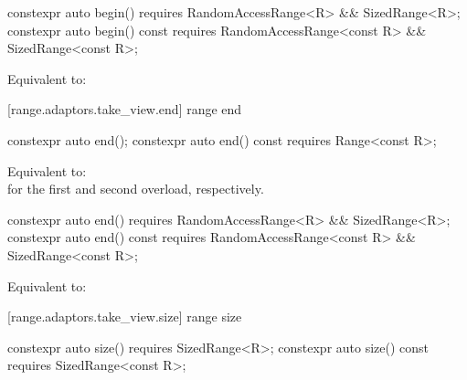 {%
\begin{itemdecl}
constexpr auto begin() requires RandomAccessRange<R> && SizedRange<R>;
constexpr auto begin() const
  requires RandomAccessRange<const R> && SizedRange<const R>;
\end{itemdecl}

\begin{itemdescr}
\pnum
\effects Equivalent to: 
\end{itemdescr}

[range.adaptors.take_view.end]{ range end}

%
\begin{itemdecl}
constexpr auto end();
constexpr auto end() const requires Range<const R>;
\end{itemdecl}

\begin{itemdescr}

\pnum
\effects Equivalent to:
 \\
 for the first and second overload, respectively.
\end{itemdescr}

%
\begin{itemdecl}
constexpr auto end() requires RandomAccessRange<R> && SizedRange<R>;
constexpr auto end() const
  requires RandomAccessRange<const R> && SizedRange<const R>;
\end{itemdecl}

\begin{itemdescr}
\pnum
\effects Equivalent to: 
\end{itemdescr}

[range.adaptors.take_view.size]{ range size}

%
\begin{itemdecl}
constexpr auto size() requires SizedRange<R>;
constexpr auto size() const requires SizedRange<const R>;
\end{itemdecl}

}
